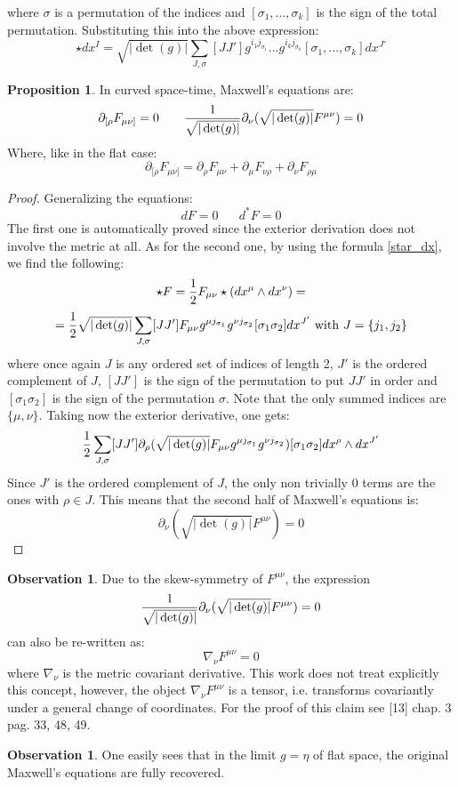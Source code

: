 \documentclass[12pt,a4paper]{report}
\theoremstyle{definition}
\theoremstyle{Theorem}
\newtheorem{Prop}[Def]{Proposition}
\theoremstyle{definition}
\theoremstyle{definition}
\newtheorem{Obs}[Def]{Observation}
\begin{document}
	where $\sigma$ is a permutation of the indices and $[\sigma_1,...,\sigma_{k}]$ is the sign of the total permutation. Substituting this into the above expression:
	\begin{equation}\label{star_dx}
		\star dx^I=\sqrt{|\det(g)|}\sum_{J,\sigma} [JJ']g^{i_1j_{\sigma_1}}...g^{i_kj_{\sigma_k}}[\sigma_1,...,\sigma_k]dx^{J'}
	\end{equation}
	\begin{Prop}
		In curved space-time, Maxwell's equations are:
		\begin{equation}
			\partial_{[\rho} F_{\mu\nu]}=0\hspace{20 pt} {1\over \sqrt{|\det(g)|}}\partial_\nu (\sqrt{|\det(g)|}F^{\mu\nu})=0
		\end{equation}
		Where, like in the flat case:
		$$\partial_{[\rho} F_{\mu\nu]}=\partial_\rho F_{\mu\nu}+\partial_\mu F_{\nu\rho}+\partial_\nu F_{\rho\mu}$$
	\end{Prop}
	\begin{proof}
		Generalizing the equations: 
		$$dF=0\hspace{20pt} d^*F=0$$
		The first one is automatically proved since the exterior derivation does not involve the metric at all. As for the second one, by using the formula \ref{star_dx}, we find the following:
		$$\star F={1\over 2} F_{\mu\nu}\star( dx^\mu\wedge dx^\nu)=$$
		$$={1\over 2}\sqrt{|\det(g)|}\sum_{J,\sigma}[JJ']F_{\mu\nu}g^{\mu j_{\sigma_1}}g^{\nu j_{\sigma_2}}[\sigma_1\sigma_2] dx^{J'}\hbox{ with } J=\{j_1,j_2\}$$
		where once again $J$ is any ordered set of indices of length 2, $J'$ is the ordered complement of $J$, $[JJ']$ is the sign of the permutation to put $JJ'$ in order and $[\sigma_1\sigma_2]$ is the sign of the permutation $\sigma$.
		Note that the only summed indices are $\{\mu,\nu\}$.
		Taking now the exterior derivative, one	gets:
		$${1\over 2} \sum_{J,\sigma} [JJ']\partial_\rho(\sqrt{|\det(g)|}F_{\mu\nu}g^{\mu j_{ \sigma_1}}g^{\nu j_{ \sigma_2}})[\sigma_1\sigma_2] dx^\rho\wedge dx^{J'}$$ 
		Since $J'$ is the ordered complement of $J$, the only non trivially 0 terms are the ones with $\rho \in J$. This means that the second half of Maxwell's equations is:
		$$\partial_\nu (\sqrt{|\det(g)|}F^{\mu\nu})=0$$
	\end{proof}
	\begin{Obs}
		Due to the skew-symmetry of $F^{\mu\nu}$, the expression 
		$${1\over \sqrt{|\det(g)|}}\partial_\nu (\sqrt{|\det(g)|}F^{\mu\nu})=0$$ can also be re-written as:
		$$\nabla_\nu F^{\mu\nu}=0$$ 
		where $\nabla_\nu$ is the metric covariant derivative. This work does not treat explicitly this concept, however, the object $\nabla_\nu F^{\mu\nu}$ is a tensor, i.e. transforms covariantly under a general change of coordinates. For the proof of this claim see [13] chap. 3 pag. 33, 48, 49.
	\end{Obs}
	\begin{Obs}
		One easily sees that in the limit $g=\eta$ of flat space, the original Maxwell's equations are fully recovered.
	\end{Obs}
\end{document}
